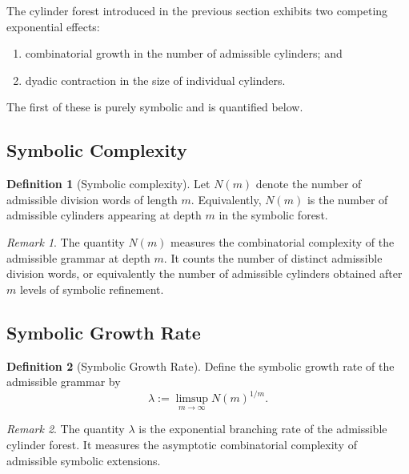 \documentclass[12pt, oneside]{article}
\numberwithin{equation}{section}
\theoremstyle{definition}
\newtheorem{definition}{Definition}[section]
\theoremstyle{plain}
\theoremstyle{remark}
\newtheorem*{remark}{Remark}
\begin{document}
The cylinder forest introduced in the previous section exhibits two
competing exponential effects:

\begin{enumerate}
\item combinatorial growth in the number of admissible cylinders; and
\item dyadic contraction in the size of individual cylinders.
\end{enumerate}

The first of these is purely symbolic and is quantified below.

\subsection{Symbolic Complexity}

\begin{definition}[Symbolic complexity]
Let \(N(m)\) denote the number of admissible division words of length \(m\).
Equivalently, \(N(m)\) is the number of admissible cylinders appearing
at depth \(m\) in the symbolic forest.
\end{definition}

\begin{remark}
The quantity \(N(m)\) measures the combinatorial complexity of the admissible
grammar at depth \(m\). It counts the number of distinct admissible division
words, or equivalently the number of admissible cylinders obtained after \(m\)
levels of symbolic refinement.
\end{remark}

\subsection{Symbolic Growth Rate}

\begin{definition}[Symbolic Growth Rate]
Define the symbolic growth rate of the admissible grammar by
\[
\lambda := \limsup_{m\to\infty} N(m)^{1/m}.
\]
\end{definition}

\begin{remark}
The quantity \(\lambda\) is the exponential branching rate of the
admissible cylinder forest. It measures the asymptotic combinatorial
complexity of admissible symbolic extensions.
\end{remark}
\end{document}
